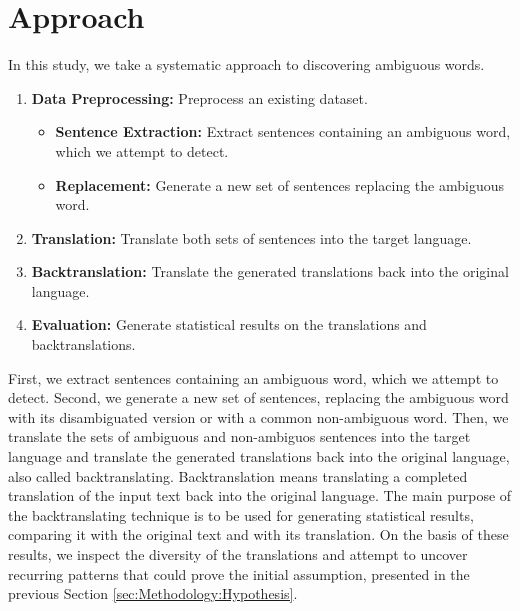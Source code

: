 \section{Approach}
\label{sec:Methodology:Approach}


In this study, we take a systematic approach to discovering ambiguous words. 

\begin{enumerate}
  \item \textbf{Data Preprocessing:} Preprocess an existing dataset.
  \begin{itemize}
    \item \textbf{Sentence Extraction:} Extract sentences containing an ambiguous word, which we attempt to detect.
    \item \textbf{Replacement:} Generate a new set of sentences replacing the ambiguous word.
  \end{itemize}
  \item \textbf{Translation:} Translate both sets of sentences into the target language.
  \item \textbf{Backtranslation:} Translate the generated translations back into the original language.
  \item \textbf{Evaluation:} Generate statistical results on the translations and backtranslations.
\end{enumerate}

First, we extract sentences containing an ambiguous word, which we attempt to detect. Second, we generate a new set of sentences, replacing the ambiguous word with its disambiguated version or with a common non-ambiguous word. Then, we translate the sets of ambiguous and non-ambiguos sentences into the target language and translate the generated translations back into the original language, also called backtranslating.
Backtranslation means translating a completed translation of the input text back into the original language. The main purpose of the backtranslating technique is to be used for generating statistical results, comparing it with the original text and with its translation. On the basis of these results, we inspect the diversity of the translations and attempt to uncover recurring patterns that could prove the initial assumption, presented in the previous Section \ref{sec:Methodology:Hypothesis}. 

